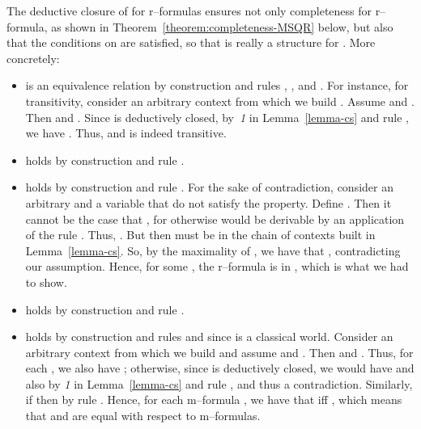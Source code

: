 \documentclass[times, 10pt]{article}
\begin{document}
\begin{figure*}[t]
The deductive closure of  for r--formulas ensures not only completeness for
r--formula, as shown in Theorem~\ref{theorem:completeness-MSQR} below, but also that
the conditions on  are satisfied, so that  is really a structure
for . More concretely:
\begin{itemize}
\item  is an equivalence relation by construction and rules , , and . 
For instance, for transitivity, consider an arbitrary context  from which we build 
. Assume  and .  Then 
 and . Since  is
deductively closed, by~\emph{1} in Lemma~\ref{lemma-cs} and rule , we have 
. Thus,  and  is indeed transitive.

\item  holds by construction and rule .

\item  holds by construction and rule .
For the sake of contradiction, consider an arbitrary  and a variable  
that do not satisfy the property. Define . 
Then it cannot be the case that , for otherwise  would be derivable by an application of the rule . Thus, 
. But then  must be in the chain of contexts built in 
Lemma~\ref{lemma-cs}. So, by the maximality of , we have that 
, contradicting our assumption. Hence, for some , the r--formula 
 is in , which is what we had to show.

\item  holds by construction and rule .

\item   holds by construction and
rules  and  since  is a classical world.
Consider an arbitrary context  from which we build  and assume
 and . Then  and 
. Thus, for each , we also have 
; otherwise, since  is deductively closed, we would have 
 and also  by \emph{1} in 
Lemma~\ref{lemma-cs} and rule , and thus a contradiction. Similarly, if 
 then  by rule . Hence, for each 
m--formula , we have that  iff , which
means that  and  are equal with respect to m--formulas. 


\end{itemize}
\end{figure*}
\end{document}
